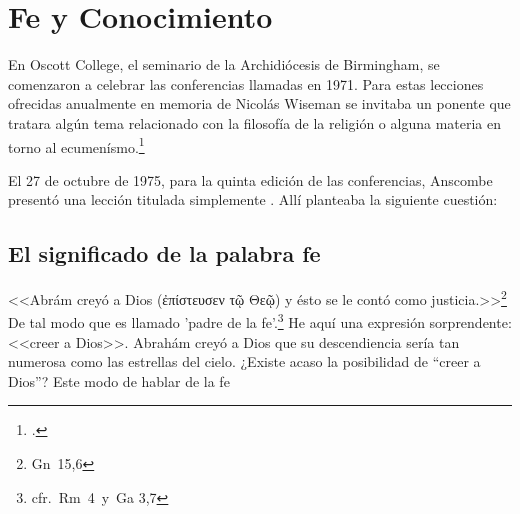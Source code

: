 \section{Fe y Conocimiento}

En Oscott College, el seminario de la Archidiócesis de Birmingham, se comenzaron a celebrar las conferencias llamadas  en 1971. Para estas lecciones ofrecidas anualmente en memoria de Nicolás Wiseman se invitaba un ponente que tratara algún tema relacionado con la filosofía de la religión o alguna materia en torno al ecumenísmo.\footcite[cf.~][p.~7]{wisemanlects}

El 27 de octubre de 1975, para la quinta edición de las conferencias, Anscombe presentó una lección titulada simplemente . Allí planteaba la siguiente cuestión:

\subsection{El significado de la palabra fe}
<<Abrám creyó a Dios (\textgreek{ἐπίστευσεν τῷ Θεῷ}) y ésto se le contó como justicia.>>\footnote{Gn~15,6} De tal modo que es llamado 'padre de la fe'.\footnote{cfr.~Rm~4~y~Ga 3,7} He aquí una expresión sorprendente: <<creer a Dios>>. Abrahám creyó a Dios que su descendiencia sería tan numerosa como las estrellas del cielo. ¿Existe acaso la posibilidad de ``creer a Dios''? Este modo de hablar de la fe
